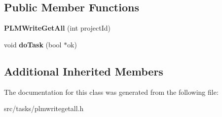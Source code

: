 \subsection*{Public Member Functions}
\begin{DoxyCompactItemize}
\item 
{\bfseries P\+L\+M\+Write\+Get\+All} (int project\+Id)\hypertarget{class_p_l_m_write_get_all_a204d4a61ac4673ff6d51d50153be0759}{}\label{class_p_l_m_write_get_all_a204d4a61ac4673ff6d51d50153be0759}

\item 
void {\bfseries do\+Task} (bool $\ast$ok)\hypertarget{class_p_l_m_write_get_all_a20b0973f10abfdb200429e7e4a6bdbe5}{}\label{class_p_l_m_write_get_all_a20b0973f10abfdb200429e7e4a6bdbe5}

\end{DoxyCompactItemize}
\subsection*{Additional Inherited Members}


The documentation for this class was generated from the following file\+:\begin{DoxyCompactItemize}
\item 
src/tasks/plmwritegetall.\+h\end{DoxyCompactItemize}
